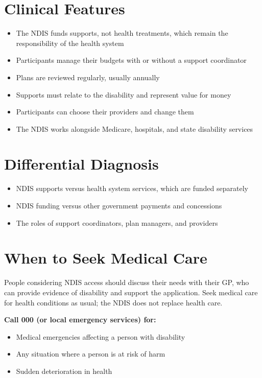 \section*{Clinical Features}
\begin{itemize}
    \item The NDIS funds supports, not health treatments, which remain the responsibility of the health system
    \item Participants manage their budgets with or without a support coordinator
    \item Plans are reviewed regularly, usually annually
    \item Supports must relate to the disability and represent value for money
    \item Participants can choose their providers and change them
    \item The NDIS works alongside Medicare, hospitals, and state disability services
\end{itemize}

\section*{Differential Diagnosis}
\begin{itemize}
    \item NDIS supports versus health system services, which are funded separately
    \item NDIS funding versus other government payments and concessions
    \item The roles of support coordinators, plan managers, and providers
\end{itemize}

\section*{When to Seek Medical Care}
People considering NDIS access should discuss their needs with their GP, who can provide evidence of disability and support the application. Seek medical care for health conditions as usual; the NDIS does not replace health care.

\textbf{Call 000 (or local emergency services) for:}
\begin{itemize}
    \item Medical emergencies affecting a person with disability
    \item Any situation where a person is at risk of harm
    \item Sudden deterioration in health
\end{itemize}

